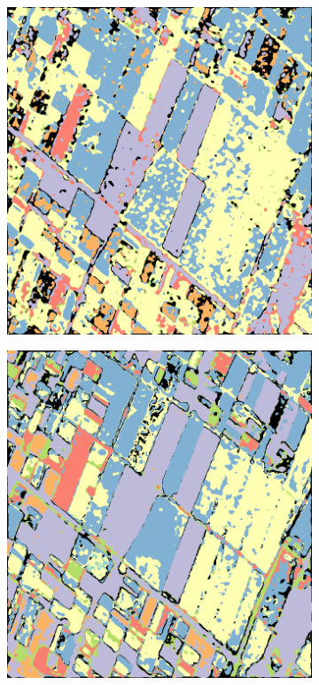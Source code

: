 \begin{figure}[t]
\begin{subfigure}[b]{0.24\textwidth}
        \includegraphics[width=\textwidth]{Figures/Kron/C_COLOUR}
        \caption{}
        \label{fig:C}
    \end{subfigure}
    \begin{subfigure}[b]{0.24\textwidth}
        \includegraphics[width=\textwidth]{Figures/Kron/Ls_COLOUR}

\end{subfigure}
\end{figure}
